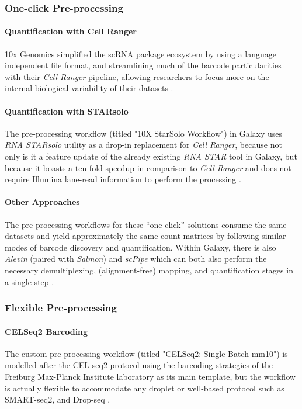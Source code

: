 \documentclass[a4paper,num-refs]{oup-contemporary}
\newcommand{\prog}[1]{\textit{#1}} %
\begin{document}
\subsubsection{One-click Pre-processing}

\paragraph{Quantification with Cell Ranger}
10x Genomics simplified the scRNA package ecosystem by using a language independent file format, and streamlining much of the barcode particularities with their \prog{Cell Ranger} pipeline, allowing researchers to focus more on the internal biological variability of their datasets \citep{zheng2017massively}.

\paragraph{Quantification with STARsolo}
The pre-processing workflow (titled "10X StarSolo Workflow") in Galaxy uses \prog{RNA STARsolo} utility as a drop-in replacement for \prog{Cell Ranger}, because not only is it a feature update of the already existing \prog{RNA STAR} tool in Galaxy, but because it boasts a ten-fold speedup in comparison to \prog{Cell Ranger} and does not require Illumina lane-read information to perform the processing \cite{dobin2013star,starsolo}.

\paragraph{Other Approaches}
The pre-processing workflows for these ``one-click'' solutions consume the same datasets and yield approximately the same count matrices by following similar modes of barcode discovery and quantification. Within Galaxy, there is also \prog{Alevin} (paired with \prog{Salmon}) and \prog{scPipe} which can both also perform the necessary demultiplexing, (alignment-free) mapping, and quantification stages in a single step \citep{alevin,salmon,scpipe}. 

\subsubsection{Flexible Pre-processing}

\paragraph{CELSeq2 Barcoding}
The custom pre-processing workflow (titled "CELSeq2: Single Batch mm10") is modelled after the CEL-seq2 protocol using the barcoding strategies of the Freiburg Max-Planck Institute laboratory as its main template, but the workflow is actually flexible to accommodate any droplet or well-based protocol such as SMART-seq2, and Drop-seq \citep{hashimshony2016cel}.
\end{document}
